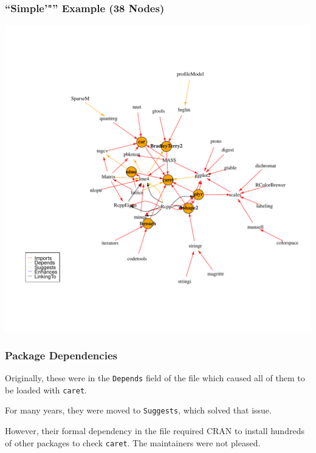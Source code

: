\documentclass[12 pt]{beamer}\usepackage[]{graphicx}\usepackage[]{color}
\newcommand{\pkg}[1]{{\fontseries{b}\selectfont #1}}
\renewcommand{\pkg}[1]{{\color{darkgreen}\texttt{#1}}}
\begin{document}

\begin{frame}[fragile]
\frametitle{``Simple'"'' Example (38 Nodes)}
\vspace{-.5in}
  \begin{center}
    \includegraphics[clip, width = .85\textwidth]{min_graph}
  \end{center}
\end{frame}




\begin{frame}[fragile]
\frametitle{Package Dependencies}


Originally, these were in the \texttt{Depends} field of the  file which caused all of them to be loaded with \pkg{caret}.

\vspace{.15in}

For many years, they were moved to \texttt{Suggests}, which solved that issue.


\vspace{.15in}

However, their formal dependency in the  file required CRAN  to install hundreds of other packages to check  \pkg{caret}. The maintainers were not pleased.

\end{frame}
\end{document}

